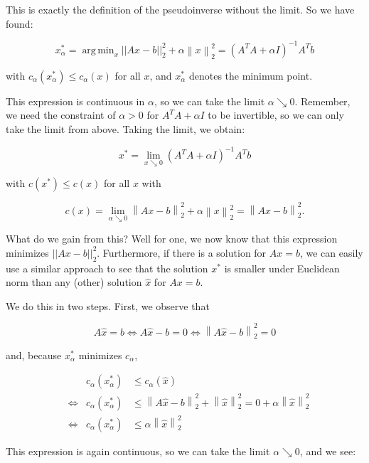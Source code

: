 \documentclass[]{scrartcl}
\DeclareMathOperator*{\argmin}{arg\,min}
\begin{document}
This is exactly the definition of the pseudoinverse without the limit.
So we have found:

\[
x^*_{\alpha} = \argmin _{x}\left| \left| Ax-b\right| \right| _{2}^{2}+\alpha \left\| x\right\| _{2}^{2} = \left( A^{T}A+\alpha I\right) ^{-1}A^{T}b
\]

with
\(c_\alpha \left (x^*_\alpha \right ) \leq c_\alpha \left ( x \right )\)
for all \(x\), and \(x^*_\alpha\) denotes the minimum point.

This expression is continuous in \(\alpha\), so we can take the limit
\(\alpha \searrow 0\). Remember, we need the constraint of
\(\alpha > 0\) for \(A^TA + \alpha I\) to be invertible, so we can only
take the limit from above. Taking the limit, we obtain:

\[
x^*= \lim_{x \searrow 0} \left( A^{T}A+\alpha I\right) ^{-1}A^{T}b
\]

with \(c \left (x^* \right ) \leq c \left ( x \right )\) for all \(x\)
with

\[c \left ( x \right ) = \lim_{\alpha \searrow 0} \left\| Ax-b\right\| _{2}^{2}+\alpha \left\| x\right\| _{2}^{2} = \left\| Ax-b\right\| _{2}^{2}.\]

What do we gain from this? Well for one, we now know that this
expression minimizes \(\left| \left| Ax-b\right| \right| _{2}^{2}\).
Furthermore, if there is a solution for \(A x =b\), we can easily use a
similar approach to see that the solution \(x^*\) is smaller under
Euclidean norm than any (other) solution \(\hat x\) for \(Ax=b\).

We do this in two steps. First, we observe that

\[A\hat x = b \Leftrightarrow A \hat x - b = 0 \Leftrightarrow \left\| A\widehat {x}-b\right\| _{2}^{2} = 0 \]

and, because \(x^*_\alpha\) minimizes \(c_\alpha\),

\[
\begin{align*}
& & c_{\alpha}\left( x_{\alpha }^{*}\right) &\leq c_{\alpha }\left( \hat {x}\right) \\
& \Leftrightarrow & c_{\alpha}\left( x_{\alpha }^{*}\right) &\leq \left\| A\hat {x}-b\right\| _{2}^{2}+\left\| \hat {x}\right\| _{2}^{2}=0+\alpha \left\| \hat x\right\| _{2}^{2} \\
& \Leftrightarrow & c_{\alpha}\left( x_{\alpha }^{*}\right) & \leq \alpha \left\| \hat x\right\| _{2}^{2} \end{align*}
\]

This expression is again continuous, so we can take the limit
\(\alpha \searrow 0\), and we see:
\end{document}
